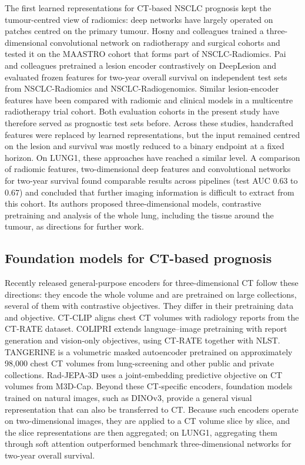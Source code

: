The first learned representations for CT-based NSCLC prognosis kept the tumour-centred view of radiomics: deep networks have largely operated on patches centred on the primary tumour. Hosny and colleagues trained a three-dimensional convolutional network on radiotherapy and surgical cohorts and tested it on the MAASTRO cohort that forms part of NSCLC-Radiomics.\cite{hosny2018} Pai and colleagues pretrained a lesion encoder contrastively on DeepLesion and evaluated frozen features for two-year overall survival on independent test sets from NSCLC-Radiomics and NSCLC-Radiogenomics.\cite{pai2024} Similar lesion-encoder features have been compared with radiomic and clinical models in a multicentre radiotherapy trial cohort.\cite{upadhaya2024} Both evaluation cohorts in the present study have therefore served as prognostic test sets before. Across these studies, handcrafted features were replaced by learned representations, but the input remained centred on the lesion and survival was mostly reduced to a binary endpoint at a fixed horizon. On LUNG1, these approaches have reached a similar level. A comparison of radiomic features, two-dimensional deep features and convolutional networks for two-year survival found comparable results across pipelines (test AUC 0.63 to 0.67) and concluded that further imaging information is difficult to extract from this cohort.\cite{braghetto2022} Its authors proposed three-dimensional models, contrastive pretraining and analysis of the whole lung, including the tissue around the tumour, as directions for further work.

\subsection{Foundation models for CT-based prognosis}\label{sec:related-fm}
Recently released general-purpose encoders for three-dimensional CT follow these directions: they encode the whole volume and are pretrained on large collections, several of them with contrastive objectives. They differ in their pretraining data and objective. CT-CLIP aligns chest CT volumes with radiology reports from the CT-RATE dataset.\cite{hamamci2026ctclip} COLIPRI extends language--image pretraining with report generation and vision-only objectives, using CT-RATE together with NLST.\cite{wald2025colipri} TANGERINE is a volumetric masked autoencoder pretrained on approximately 98,000 chest CT volumes from lung-screening and other public and private collections.\cite{mcconnell2026tangerine} Rad-JEPA-3D uses a joint-embedding predictive objective on CT volumes from M3D-Cap.\cite{trinh2026radjepa} Beyond these CT-specific encoders, foundation models trained on natural images, such as DINOv3, provide a general visual representation that can also be transferred to CT.\cite{simeoni2025dinov3} Because such encoders operate on two-dimensional images, they are applied to a CT volume slice by slice, and the slice representations are then aggregated; on LUNG1, aggregating them through soft attention outperformed benchmark three-dimensional networks for two-year overall survival.\cite{paolo2026}

